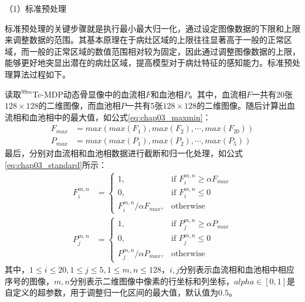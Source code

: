 （1）标准预处理

标准预处理的关键步骤就是执行最小最大归一化，通过设定图像数据的下限和上限来调整数据的范围。其基本原理在于病灶区域的上限往往显著高于一般的正常区域，而一般的正常区域的数值范围相对较为固定，因此通过调整图像数据的上限，能够更好地突显出潜在的病灶区域，提高模型对于病灶特征的感知能力。标准预处理算法过程如下。

读取\(^{99m}\)Tc-MDP动态骨显像中的血流相\(F\)和血池相\(P\)。其中，血流相\(F\)一共有20张\(128 \times 128\)的二维图像，而血池相\(P\)一共有5张\(128 \times 128\)的二维图像。随后计算出血流相和血池相中的最大值，如公式\ref{eq:chap03_maxmin}：
\begin{equation}
  \begin{aligned}
    F_{max} & = max(max(F_1), max(F_2), \cdots, max(F_{20})) \\
    P_{max} & = max(max(P_1), max(P_2), \cdots, max(P_5))
  \end{aligned}
  \label{eq:chap03_maxmin}
\end{equation}
最后，分别对血流相和血池相数据进行截断和归一化处理，如公式\ref{eq:chap03_standard}所示：
\begin{equation}
  \begin{aligned}
    F_i^{m, n} & =
    \begin{cases}
      1,                           & \text{if \(F_i^{m, n} \geq \alpha F_{max} \)} \\
      0,                           & \text{if \(F_i^{m, n} \leq 0\)}               \\
      F_i^{m, n} / \alpha F_{max}, & \text{otherwise}
    \end{cases} \\
    P_j^{m, n} & =
    \begin{cases}
      1,                           & \text{if \(P_j^{m, n} \geq \alpha P_{max} \)} \\
      0,                           & \text{if \(P_j^{m, n} \leq 0\)}               \\
      P_j^{m, n} / \alpha P_{max}, & \text{otherwise}
    \end{cases}
  \end{aligned}
  \label{eq:chap03_standard}
\end{equation}
其中，\( 1 \leq i \leq 20, 1 \leq j \leq 5, 1 \leq m, n \leq 128 \)，\(i, j\)分别表示血流相和血池相中相应序号的图像，\(m, n\)分别表示二维图像中像素的行坐标和列坐标，\(alpha \in [0,1]\)是自定义的超参数，用于调整归一化区间的最大值，默认值为\(0.5\)。

